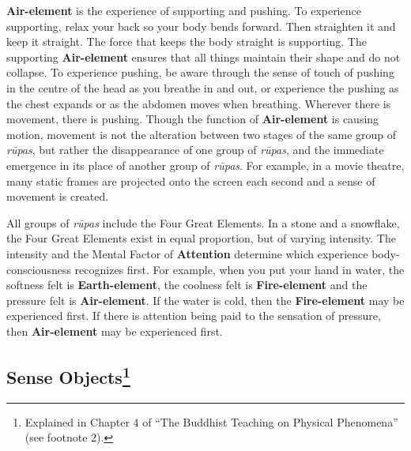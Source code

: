 \textbf{Air-element} is the experience of supporting and pushing. To experience supporting, relax your back so your body bends forward. Then straighten it and keep it straight. The force that keeps the body straight is supporting. The supporting \textbf{Air-element} ensures that all things maintain their shape and do not collapse. To experience pushing, be aware through the sense of touch of pushing in the centre of the head as you breathe in and out, or experience the pushing as the chest expands or as the abdomen moves when breathing. Wherever there is movement, there is pushing. Though the function of \textbf{Air-element} is causing motion, movement is not the alteration between two stages of the same group of \textit{rūpas}, but rather the disappearance of one group of \textit{rūpas}, and the immediate emergence in its place of another group of \textit{rūpas}. For example, in a movie theatre, many static frames are projected onto the screen each second and a sense of movement is created.

All groups of \textit{rūpas} include the Four Great Elements. In a stone and a snowflake, the Four Great Elements exist in equal proportion, but of varying intensity. The intensity and the Mental Factor of \textbf{Attention} determine which experience body-consciousness recognizes first. For example, when you put your hand in water, the softness felt is \textbf{Earth-element}, the coolness felt is \textbf{Fire-element} and the pressure felt is \textbf{Air-element}. If the water is cold, then the \textbf{Fire-element} may be experienced first. If there is attention being paid to the sensation of pressure, then \textbf{Air-element} may be experienced first.

\subsection*{Sense Objects\footnote{Explained in Chapter 4 of “The Buddhist Teaching on Physical Phenomena” (see footnote 2).}}

